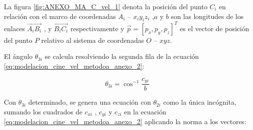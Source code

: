         \newpage


        La figura \ref{fig:ANEXO_MA_C_vel_1} denota la posición del punto  $C_{i}$  en relación con el marco de coordenadas  $A_{i}$ – $x_{i}y_{i}z_{i}$ ,$a$  y  $b$ son las longitudes de los enlaces $\overrightarrow{A_{i}B_{i}}$ , y  $\overrightarrow{B_{i}C_{i}}$  respectivamente y $\overrightarrow{p}= \left[ p_{x},p_{y},p_{z} \right] ^{T}$  es el vector de posición del punto $P$   relativo al sistema de coordenadas $O$ – $xyz$.
        
        El ángulo $\theta _{3i}$  se calcula resolviendo la segunda fila de la ecuación \ref{eq:modelacion_cine_vel_metodoa_anexo_2}:

        \begin{equation}
            \theta _{3i}= \cos ^{-1}\frac{c_{yi}}{b} 
            \label{eq:modelacion_cine_vel_metodoa_anexo_3}
        \end{equation}
        
        Con  $\theta _{3i}$  determinado, se genera una ecuación con $\theta _{2i}$ como la única incógnita, sumando los cuadrados de  $c_{xi}$ ,  $c_{yi}$  y  $c_{zi}$ en la ecuación \ref{eq:modelacion_cine_vel_metodoa_anexo_2} aplicando la norma a los vectores:
        \vspace{-1em}
        
